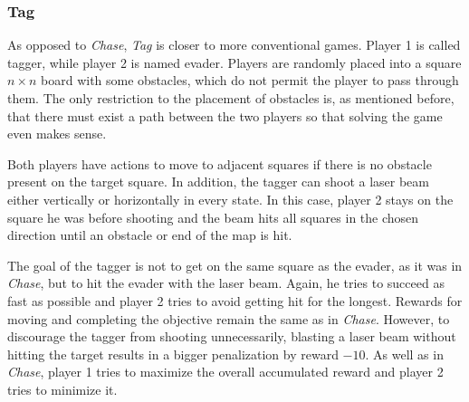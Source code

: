 \documentclass[../main.tex]{subfiles}
\begin{document}
\subsubsection{Tag}\label{exp:sg:games:tag}
As opposed to \textit{Chase}, \textit{Tag} is closer to more conventional games.
Player 1 is called tagger, while player 2 is named evader.
Players are randomly placed into a square $n \times n$ board with some obstacles, which do not permit the player to pass through them.
The only restriction to the placement of obstacles is, as mentioned before, that there must exist a path between the two players so that solving the game even makes sense.

Both players have actions to move to adjacent squares if there is no obstacle present on the target square.
In addition, the tagger can shoot a laser beam either vertically or horizontally in every state.
In this case, player 2 stays on the square he was before shooting and the beam hits all squares in the chosen direction until an obstacle or end of the map is hit.

The goal of the tagger is not to get on the same square as the evader, as it was in \textit{Chase}, but to hit the evader with the laser beam.
Again, he tries to succeed as fast as possible and player 2 tries to avoid getting hit for the longest.
Rewards for moving and completing the objective remain the same as in \textit{Chase}.
However, to discourage the tagger from shooting unnecessarily, blasting a laser beam without hitting the target results in a bigger penalization by reward $-10$.
As well as in \textit{Chase}, player 1 tries to maximize the overall accumulated reward and player 2 tries to minimize it.
\end{document}
